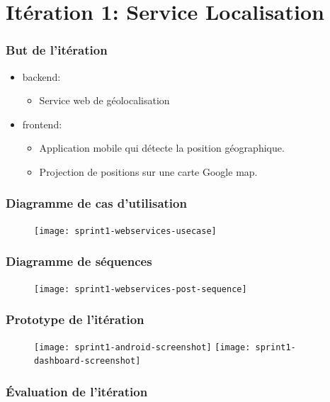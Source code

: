 \documentclass{beamer}
\begin{document}
\section{Itération 1: Service Localisation}

\begin{frame}
    \frametitle{But de l'itération}
    \begin{itemize}
        \item backend:
        \begin{itemize}
        \item Service web de géolocalisation
        \end{itemize}
    \item frontend:
        \begin{itemize}
        \item Application mobile qui détecte la position géographique.
        \item Projection de positions sur une carte Google map.
    \end{itemize}
    \end{itemize}
\end{frame}

\begin{frame}
    \frametitle{Diagramme de cas d'utilisation}
    \begin{figure}
        \texttt{[image: sprint1-webservices-usecase]}
    \end{figure}
\end{frame}

\begin{frame}
    \frametitle{Diagramme de séquences}
    \begin{figure}
        \texttt{[image: sprint1-webservices-post-sequence]}
    \end{figure}
\end{frame}

\begin{frame}
    \frametitle{Prototype de l'itération}
    \begin{figure}
        \texttt{[image: sprint1-android-screenshot]}
        \texttt{[image: sprint1-dashboard-screenshot]}
    \end{figure}
\end{frame}

\begin{frame}
\frametitle{Évaluation de l'itération}
\begin{minipage}{\textwidth}

\end{minipage}
\end{frame}
\end{document}

